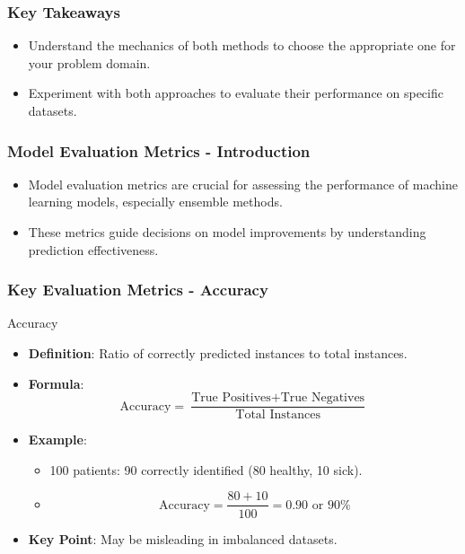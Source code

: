 \documentclass[aspectratio=169]{beamer}
\begin{document}
\begin{frame}
    \frametitle{Key Takeaways}
    \begin{itemize}
        \item Understand the mechanics of both methods to choose the appropriate one for your problem domain.
        \item Experiment with both approaches to evaluate their performance on specific datasets.
    \end{itemize}
\end{frame}

\begin{frame}[fragile]
    \frametitle{Model Evaluation Metrics - Introduction}
    \begin{itemize}
        \item Model evaluation metrics are crucial for assessing the performance of machine learning models, especially ensemble methods.
        \item These metrics guide decisions on model improvements by understanding prediction effectiveness.
    \end{itemize}
\end{frame}

\begin{frame}[fragile]
    \frametitle{Key Evaluation Metrics - Accuracy}
    \begin{block}{Accuracy}
        \begin{itemize}
            \item \textbf{Definition}: Ratio of correctly predicted instances to total instances.
            \item \textbf{Formula}:
            \begin{equation}
            \text{Accuracy} = \frac{\text{True Positives} + \text{True Negatives}}{\text{Total Instances}}
            \end{equation}
            \item \textbf{Example}: 
            \begin{itemize}
                \item 100 patients: 90 correctly identified (80 healthy, 10 sick).
                \item 
                \[
                \text{Accuracy} = \frac{80 + 10}{100} = 0.90 \text{ or } 90\%
                \]
            \end{itemize}
            \item \textbf{Key Point}: May be misleading in imbalanced datasets.
        \end{itemize}
    \end{block}
\end{frame}
\end{document}
